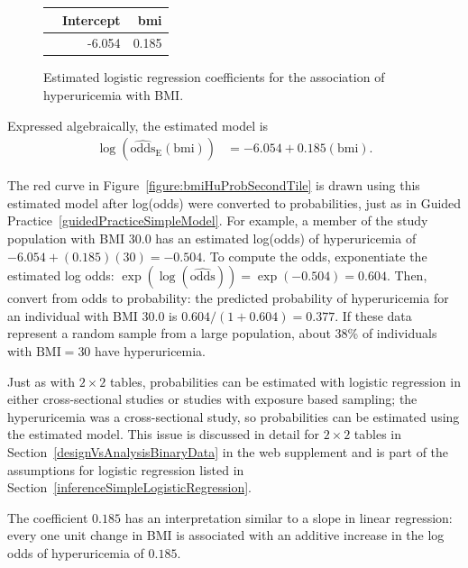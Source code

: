 \begin{figure}[ht]
\centering
\begin{tabular}{rrr}
  \hline
 & Intercept & bmi  \\
  \hline
 & -6.054 & 0.185  \\
   \hline
\end{tabular}
\caption{Estimated logistic regression coefficients for the association of hyperuricemia with BMI.}
\label{figure:bmiHyperuricemiaLogRegCoeff}
\end{figure}

Expressed algebraically, the estimated model is
\begin{align}
  \log(\widehat{\text{odds}}_\text{E}(\text{bmi})) &= -6.054 + 0.185 (\text{bmi}).
  \label{eqn:bmiHyperuricemiaModel}
\end{align}

The red curve in Figure~\ref{figure:bmiHuProbSecondTile} is drawn using this estimated model after log(odds) were converted to probabilities, just as in Guided Practice~\ref{guidedPracticeSimpleModel}. For example, a member of the study population with BMI 30.0 has an estimated log(odds) of hyperuricemia of $-6.054 + (0.185)(30) = -0.504$. To compute the odds, exponentiate the estimated log odds: $\exp(\log(\widehat{\text{odds}})) = \exp(-0.504) = 0.604$. Then, convert from odds to probability: the predicted probability of hyperuricemia for an individual with BMI 30.0 is $0.604/(1 + 0.604) = 0.377$. If these data represent a random sample from a large population, about 38\% of individuals with $\text{BMI} = 30$ have hyperuricemia.


Just as with $2 \times 2$ tables, probabilities can be estimated with logistic regression in either cross-sectional studies or studies with exposure based sampling; the hyperuricemia was a cross-sectional study, so probabilities can be estimated using the estimated model. This issue is discussed in detail for $2 \times 2$ tables in Section~\ref{designVsAnalysisBinaryData} in the web supplement and is part of the assumptions for logistic regression listed in Section~\ref{inferenceSimpleLogisticRegression}.

The coefficient $0.185$ has an interpretation similar to a slope in linear regression: every one unit change in BMI is associated with an additive increase in the log odds of hyperuricemia of $0.185$.

